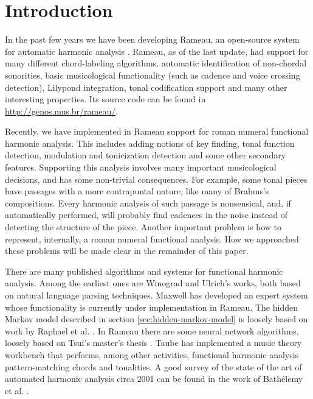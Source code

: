 
\section{Introduction}
\label{sec:introduction}


In the past few years we have been developing Rameau, an open-source
system for automatic harmonic analysis \cite{kroger08:rameau}. Rameau,
as of the last update, had support for many different chord-labeling
algorithms, automatic identification of non-chordal sonorities, basic
musicological functionality (such as cadence and voice crossing
detection), Lilypond \cite{nienhuys.ea08:lilypond} integration, tonal
codification support and many other interesting properties. Its source
code can be found in \url{http://genos.mus.br/rameau/}.


Recently, we have implemented in Rameau support for roman numeral
functional harmonic analysis. This includes adding notions of
key finding, tonal function detection, modulation and tonicization
detection and some other secondary features. Supporting this analysis
involves many important musicological decisions, and has some
non-trivial consequences. For example, some tonal pieces have passages
with a more contrapuntal nature, like many of Brahms's compositions.
Every harmonic analysis of such passage is nonsensical, and, if
automatically performed, will probably find cadences in the noise
instead of detecting the structure of the piece. Another important
problem is how to represent, internally, a roman numeral functional
analysis. How we approached these problems will be made clear in the
remainder of this paper.

There are many published algorithms and systems for functional
harmonic analysis. Among the earliest ones are Winograd
\cite{winograd68:linguistics} and Ulrich's \cite{ulrich77:analysis}
works, both based on natural language parsing techniques. Maxwell
\cite{maxwell92:expert} has developed an expert system whose
functionality is currently under implementation in Rameau. The hidden
Markov model described in section \ref{sec:hidden-markov-model} is
loosely based on work by Raphael et
al. \cite{raphael.ea03:harmonic}. In Rameau there are some neural
network algorithms, loosely based on Tsui's master's thesis
\cite{tsui02:harmonic}. Taube \cite{taube99:automatic} has implemented
a music theory workbench that performs, among other activities,
functional harmonic analysis pattern-matching chords and tonalities. A
good survey of the state of the art of automated harmonic analysis
circa 2001 can be found in the work of Bathélemy et
al. \cite{barthelemy.ea01:figured}.

